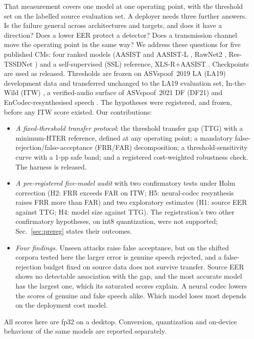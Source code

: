 \documentclass[conference]{IEEEtran}
\begin{document}
That measurement covers one model at one operating point, with the threshold
set on the labelled source evaluation set. A deployer needs three further
answers. Is the failure general across architectures and targets, and does it
have a direction? Does a lower EER protect a detector? Does a transmission
channel move the operating point in the same way? We address these questions
for five published CMs: four ranked models (AASIST and AASIST-L
\cite{jung22_aasist}, RawNet2 \cite{tak21_rawnet2}, Res-TSSDNet
\cite{hua21_res_tssdnet}) and a self-supervised (SSL) reference, XLS-R+AASIST
\cite{tak22_xlsr_aasist}. Checkpoints are used as released. Thresholds are
frozen on ASVspoof~2019 LA (LA19) development data and transferred unchanged to
the LA19 evaluation set, In-the-Wild (ITW) \cite{muller22_in_the_wild}, a
verified-audio surface of ASVspoof~2021 DF (DF21) \cite{liu23_asvspoof2021} and
EnCodec-resynthesised speech \cite{defossez23_encodec}. The hypotheses were
registered, and frozen, before any ITW score existed. Our contributions:
\begin{itemize}
\item \emph{A fixed-threshold transfer protocol}: the threshold transfer gap
  (TTG) with a minimum-HTER reference, defined at any operating point; a
  mandatory false-rejection/false-acceptance (FRR/FAR) decomposition; a
  threshold-sensitivity curve with a 1-pp safe band; and a registered
  cost-weighted robustness check. The harness is released.
\item \emph{A pre-registered five-model audit} with two confirmatory tests under
  Holm correction (H2: FRR exceeds FAR on ITW; H5: neural-codec resynthesis
  raises FRR more than FAR) and two exploratory estimates (H1: source EER
  against TTG; H4: model size against TTG). The registration's two other
  confirmatory hypotheses, on int8 quantization, were not supported;
  Sec.~\ref{sec:prereg} states their outcomes.
\item \emph{Four findings.} Unseen attacks raise false acceptance, but on the
  shifted corpora tested here the larger error is genuine speech rejected, and a
  false-rejection budget fixed on source data does not survive transfer.
  Source EER shows no detectable association with the gap, and the most
  accurate model has the largest one, which its saturated scores explain. A
  neural codec lowers the scores of genuine and fake speech alike. Which model
  loses most depends on the deployment cost model.
\end{itemize}
All scores here are fp32 on a desktop. Conversion, quantization and on-device
behaviour of the same models are reported separately.
\end{document}
